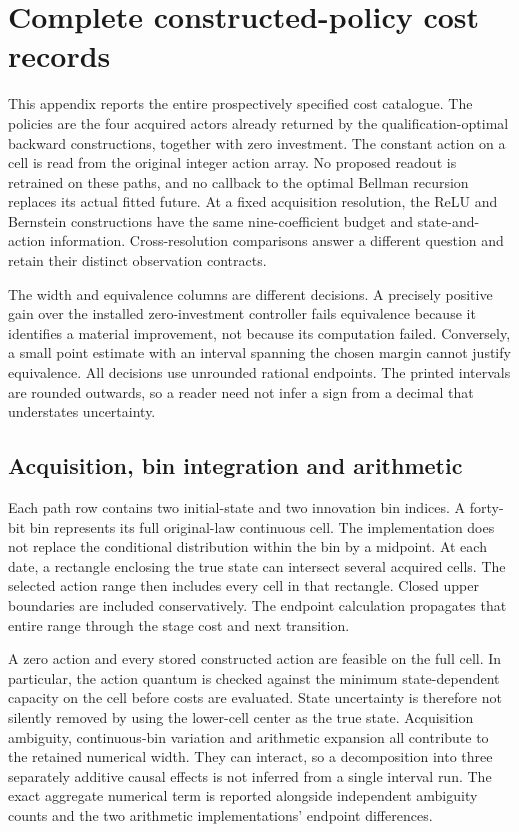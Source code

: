 \section{Complete constructed-policy cost records}\label{app:numerical77}
This appendix reports the entire prospectively specified cost catalogue. The policies are the four acquired actors already returned by the qualification-optimal backward constructions, together with zero investment. The constant action on a cell is read from the original integer action array. No proposed readout is retrained on these paths, and no callback to the optimal Bellman recursion replaces its actual fitted future. At a fixed acquisition resolution, the ReLU and Bernstein constructions have the same nine-coefficient budget and state-and-action information. Cross-resolution comparisons answer a different question and retain their distinct observation contracts.




The width and equivalence columns are different decisions. A precisely positive gain over the installed zero-investment controller fails equivalence because it identifies a material improvement, not because its computation failed. Conversely, a small point estimate with an interval spanning the chosen margin cannot justify equivalence. All decisions use unrounded rational endpoints. The printed intervals are rounded outwards, so a reader need not infer a sign from a decimal that understates uncertainty.

\subsection{Acquisition, bin integration and arithmetic}
Each path row contains two initial-state and two innovation bin indices. A forty-bit bin represents its full original-law continuous cell. The implementation does not replace the conditional distribution within the bin by a midpoint. At each date, a rectangle enclosing the true state can intersect several acquired cells. The selected action range then includes every cell in that rectangle. Closed upper boundaries are included conservatively. The endpoint calculation propagates that entire range through the stage cost and next transition.

A zero action and every stored constructed action are feasible on the full cell. In particular, the action quantum is checked against the minimum state-dependent capacity on the cell before costs are evaluated. State uncertainty is therefore not silently removed by using the lower-cell center as the true state. Acquisition ambiguity, continuous-bin variation and arithmetic expansion all contribute to the retained numerical width. They can interact, so a decomposition into three separately additive causal effects is not inferred from a single interval run. The exact aggregate numerical term is reported alongside independent ambiguity counts and the two arithmetic implementations' endpoint differences.

